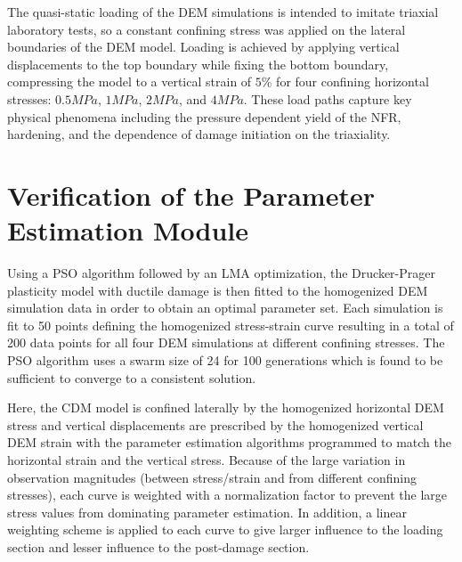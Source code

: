 The quasi-static loading of the DEM simulations is intended to imitate triaxial laboratory tests, so a constant confining stress was applied on the lateral boundaries of the DEM model. Loading is achieved by applying vertical displacements to the top boundary while fixing the bottom boundary, compressing the model to a vertical strain of $5\%$ for four confining horizontal stresses: $0.5MPa$, $1MPa$, $2MPa$, and $4MPa$. These load paths capture key physical phenomena including the pressure dependent yield of the NFR, hardening, and the dependence of damage initiation on the triaxiality. 


\section{Verification of the Parameter Estimation Module}

Using a PSO algorithm followed by an LMA optimization, the Drucker-Prager plasticity model with ductile damage is then fitted to the homogenized DEM simulation data in order to obtain an optimal parameter set. Each simulation is fit to 50 points defining the homogenized stress-strain curve resulting in a total of 200 data points for all four DEM simulations at different confining stresses. The PSO algorithm uses a swarm size of 24 for 100 generations which is found to be sufficient to converge to a consistent solution. 

Here, the CDM model is confined laterally by the homogenized horizontal DEM stress and vertical displacements are prescribed by the homogenized vertical DEM strain with the parameter estimation algorithms programmed to match the horizontal strain and the vertical stress. Because of the large variation in observation magnitudes (between stress/strain and from different confining stresses), each curve is weighted with a normalization factor to prevent the large stress values from dominating parameter estimation. In addition, a linear weighting scheme is applied to each curve to give larger influence to the loading section and lesser influence to the post-damage section.

